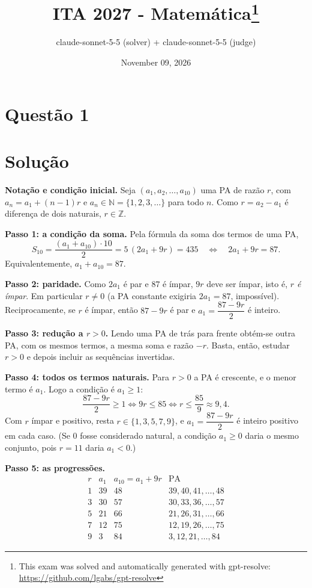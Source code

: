 \documentclass{article}%
\title{ITA 2027 - Matemática\thanks{This exam was solved and automatically generated with gpt-resolve: \url{https://github.com/lgabs/gpt-resolve}}}%
\author{claude{-}sonnet{-}5{-}5 (solver) + claude{-}sonnet{-}5{-}5 (judge)}%
\date{November 09, 2026}%
\begin{document}
%
\normalsize%
\maketitle%
\section*{Questão 1}

\section*{Solução}

\textbf{Notação e condição inicial.} Seja $(a_1,a_2,\dots,a_{10})$ uma PA de razão $r$, com $a_n=a_1+(n-1)r$ e $a_n\in\mathbb{N}=\{1,2,3,\dots\}$ para todo $n$. Como $r=a_2-a_1$ é diferença de dois naturais, $r\in\mathbb{Z}$.

\textbf{Passo 1: a condição da soma.} Pela fórmula da soma dos termos de uma PA,
\[
S_{10}=\frac{(a_1+a_{10})\cdot 10}{2}=5\,(2a_1+9r)=435
\quad\Longleftrightarrow\quad 2a_1+9r=87 .
\]
Equivalentemente, $a_1+a_{10}=87$.

\textbf{Passo 2: paridade.} Como $2a_1$ é par e $87$ é ímpar, $9r$ deve ser ímpar, isto é, \emph{$r$ é ímpar}. Em particular $r\neq 0$ (a PA constante exigiria $2a_1=87$, impossível). Reciprocamente, se $r$ é ímpar, então $87-9r$ é par e $a_1=\dfrac{87-9r}{2}$ é inteiro.

\textbf{Passo 3: redução a $r>0$.} Lendo uma PA de trás para frente obtém-se outra PA, com os mesmos termos, a mesma soma e razão $-r$. Basta, então, estudar $r>0$ e depois incluir as sequências invertidas.

\textbf{Passo 4: todos os termos naturais.} Para $r>0$ a PA é crescente, e o menor termo é $a_1$. Logo a condição é $a_1\ge 1$:
\[
\frac{87-9r}{2}\ge 1\iff 9r\le 85\iff r\le \frac{85}{9}\approx 9{,}4 .
\]
Com $r$ ímpar e positivo, resta $r\in\{1,3,5,7,9\}$, e $a_1=\dfrac{87-9r}{2}$ é inteiro positivo em cada caso. (Se $0$ fosse considerado natural, a condição $a_1\ge 0$ daria o mesmo conjunto, pois $r=11$ daria $a_1<0$.)

\textbf{Passo 5: as progressões.}
\[
\begin{array}{c|c|c|c}
r & a_1 & a_{10}=a_1+9r & \text{PA}\\ \hline
1 & 39 & 48 & 39,40,41,\dots,48\\
3 & 30 & 57 & 30,33,36,\dots,57\\
5 & 21 & 66 & 21,26,31,\dots,66\\
7 & 12 & 75 & 12,19,26,\dots,75\\
9 & 3 & 84 & 3,12,21,\dots,84
\end{array}
\]
\end{document}
